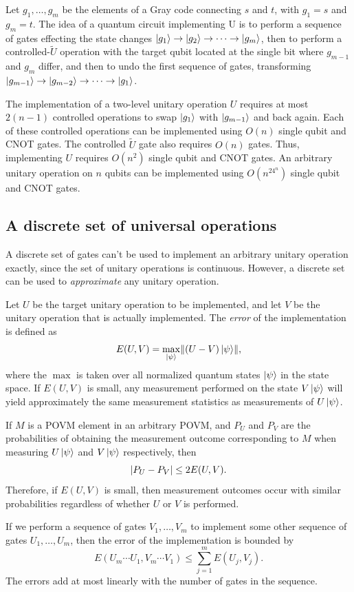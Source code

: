 Let $g_1, \ldots, g_m$ be the elements of a Gray code connecting $s$ and $t$,
with $g_1 = s$ and $g_m = t$.
The idea of a quantum circuit implementing U is to perform a sequence of gates effecting the state changes $\ket{g_1} \to \ket{g_2} \to \cdots \to \ket{g_m}$,
then to perform a controlled-$\tilde{U}$ operation with the target qubit located at the single bit where $g_{m-1}$ and $g_m$ differ,
and then to undo the first sequence of gates,
transforming $\ket{g_{m-1}} \to \ket{g_{m-2}} \to \cdots \to \ket{g_1}$.
 
The implementation of a two-level unitary operation $U$ requires at most $2(n-1)$ controlled operations to swap $\ket{g_1}$ with $\ket{g_{m-1}}$ and back again.
Each of these controlled operations can be implemented using $O(n)$ single qubit and CNOT gates.
The controlled $\tilde{U}$ gate also requires $O(n)$ gates.
Thus, implementing $U$ requires $O(n^2)$ single qubit and CNOT gates.
An arbitrary unitary operation on $n$ qubits can be implemented using $O(n^24^n)$ single qubit and CNOT gates.

\subsection{A discrete set of universal operations}
A discrete set of gates can't be used to implement an arbitrary unitary operation exactly,
since the set of unitary operations is continuous.
However, a discrete set can be used to \emph{approximate} any unitary operation.

Let $U$ be the target unitary operation to be implemented, and let $V$ be the unitary operation that is actually implemented.
The \emph{error} of the implementation is defined as
\[
    E(U, V) = \max_{\ket{\psi}} \lVert(U - V)\ket{\psi}\rVert,
\]
where the $\max$ is taken over all normalized quantum states $\ket{\psi}$ in the state space.
If $E(U, V)$ is small, any measurement performed on the state $V\ket{\psi}$ will yield approximately the same measurement statistics as measurements of $U\ket{\psi}$.

If $M$ is a POVM element in an arbitrary POVM,
and $P_U$ and $P_V$ are the probabilities of obtaining the measurement outcome corresponding to $M$ when measuring $U\ket{\psi}$ and $V\ket{\psi}$ respectively,
then
\[
    \lvert P_U - P_V\rvert \leq 2E(U, V).
\]
Therefore, if $E(U, V)$ is small,
then measurement outcomes occur with similar probabilities regardless of whether $U$ or $V$ is performed.

If we perform a sequence of gates $V_1, \ldots, V_m$ to implement some other sequence of gates $U_1, \ldots, U_m$,
then the error of the implementation is bounded by
\[
    E(U_m\cdots U_1, V_m\cdots V_1) \leq \sum_{j=1}^m E(U_j, V_j).
\]
The errors add at most linearly with the number of gates in the sequence.

